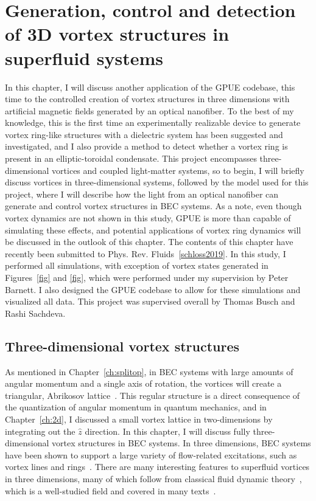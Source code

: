 \chapter{Generation, control and detection of 3D vortex structures in superfluid systems}
\label{ch:vortex_states}

In this chapter, I will discuss another application of the GPUE codebase, this time to the controlled creation of vortex structures in three dimensions with artificial magnetic fields generated by an optical nanofiber.
To the best of my knowledge, this is the first time an experimentally realizable device to generate vortex ring-like structures with a dielectric system has been suggested and investigated, and I also provide a method to detect whether a vortex ring is present in an elliptic-toroidal condensate.
This project encompasses three-dimensional vortices and coupled light-matter systems, so to begin, I will briefly discuss vortices in three-dimensional systems, followed by the model used for this project, where I will describe how the light from an optical nanofiber can generate and control vortex structures in BEC systems.
As a note, even though vortex dynamics are not shown in this study, GPUE is more than capable of simulating these effects, and potential applications of vortex ring dynamics will be discussed in the outlook of this chapter.
The contents of this chapter have recently been submitted to Phys. Rev. Fluids~\ref{schloss2019}.
In this study, I performed all simulations, with exception of vortex states generated in Figures~\ref{fig} and \ref{fig}, which were performed under my supervision by Peter Barnett.
I also designed the GPUE codebase to allow for these simulations and visualized all data.
This project was supervised overall by Thomas Busch and Rashi Sachdeva.


\section{Three-dimensional vortex structures}
\label{sec:vortex}

As mentioned in Chapter~\ref{ch:splitop}, in BEC systems with large amounts of angular momentum and a single axis of rotation, the vortices will create a triangular, Abrikosov lattice~\cite{abo2001, abrikosov1957}. 
This regular structure is a direct consequence of the quantization of angular momentum in quantum mechanics, and in Chapter~\ref{ch:2d}, I discussed a small vortex lattice in two-dimensions by integrating out the $\hat z$ direction.
In this chapter, I will discuss fully three-dimensional vortex structures in BEC systems. 
In three dimensions, BEC systems have been shown to support a large variety of flow-related excitations, such as vortex lines and rings~\cite{madison2000,abo2001, wacks2014, anderson2001, bulgac2014, ku2016, matthews1999, yefsah2013}.
There are many interesting features to superfluid vortices in three dimensions, many of which follow from classical fluid dynamic theory~\cite{fetter2009}, which is a well-studied field and covered in many texts~\cite{faber1995, kundu2012, tritton1988, landau1987}.

